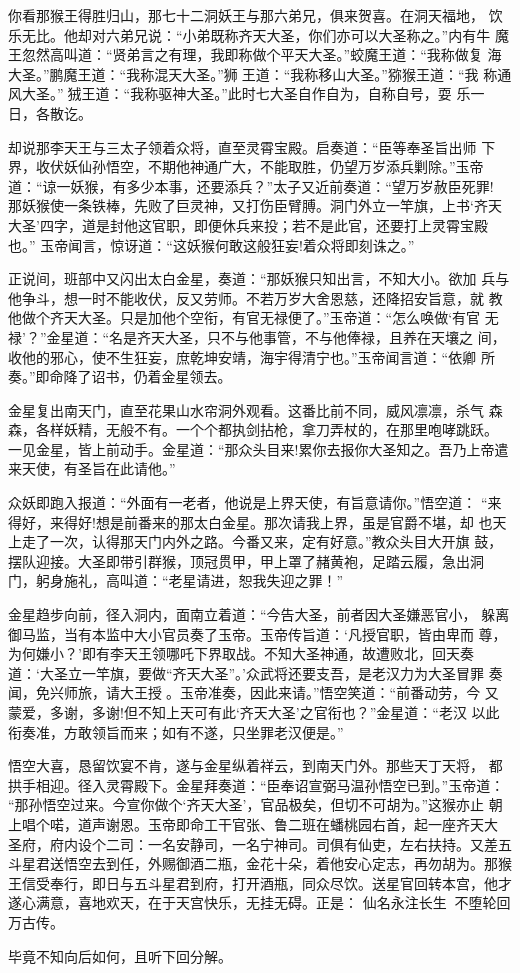 你看那猴王得胜归山，那七十二洞妖王与那六弟兄，俱来贺喜。在洞天福地，
饮乐无比。他却对六弟兄说：“小弟既称齐天大圣，你们亦可以大圣称之。”内有牛
魔王忽然高叫道：“贤弟言之有理，我即称做个平天大圣。”蛟魔王道：“我称做复
海大圣。”鹏魔王道：“我称混天大圣。”狮王道：“我称移山大圣。”猕猴王道：“我
称通风大圣。”狨王道：“我称驱神大圣。”此时七大圣自作自为，自称自号，耍
乐一日，各散讫。

却说那李天王与三太子领着众将，直至灵霄宝殿。启奏道：“臣等奉圣旨出师
下界，收伏妖仙孙悟空，不期他神通广大，不能取胜，仍望万岁添兵剿除。”玉帝
道：“谅一妖猴，有多少本事，还要添兵？”太子又近前奏道：“望万岁赦臣死罪!
那妖猴使一条铁棒，先败了巨灵神，又打伤臣臂膊。洞门外立一竿旗，上书‘齐天
大圣’四字，道是封他这官职，即便休兵来投；若不是此官，还要打上灵霄宝殿也。”
玉帝闻言，惊讶道：“这妖猴何敢这般狂妄!着众将即刻诛之。”

正说间，班部中又闪出太白金星，奏道：“那妖猴只知出言，不知大小。欲加
兵与他争斗，想一时不能收伏，反又劳师。不若万岁大舍恩慈，还降招安旨意，就
教他做个齐天大圣。只是加他个空衔，有官无禄便了。”玉帝道：“怎么唤做‘有官
无禄’？”金星道：“名是齐天大圣，只不与他事管，不与他俸禄，且养在天壤之
间，收他的邪心，使不生狂妄，庶乾坤安靖，海宇得清宁也。”玉帝闻言道：“依卿
所奏。”即命降了诏书，仍着金星领去。

金星复出南天门，直至花果山水帘洞外观看。这番比前不同，威风凛凛，杀气
森森，各样妖精，无般不有。一个个都执剑拈枪，拿刀弄杖的，在那里咆哮跳跃。
一见金星，皆上前动手。金星道：“那众头目来!累你去报你大圣知之。吾乃上帝遣
来天使，有圣旨在此请他。”

众妖即跑入报道：“外面有一老者，他说是上界天使，有旨意请你。”悟空道：
“来得好，来得好!想是前番来的那太白金星。那次请我上界，虽是官爵不堪，却
也天上走了一次，认得那天门内外之路。今番又来，定有好意。”教众头目大开旗
鼓，摆队迎接。大圣即带引群猴，顶冠贯甲，甲上罩了赭黄袍，足踏云履，急出洞
门，躬身施礼，高叫道：“老星请进，恕我失迎之罪！”

金星趋步向前，径入洞内，面南立着道：“今告大圣，前者因大圣嫌恶官小，
躲离御马监，当有本监中大小官员奏了玉帝。玉帝传旨道：‘凡授官职，皆由卑而
尊，为何嫌小？’即有李天王领哪吒下界取战。不知大圣神通，故遭败北，回天奏
道：‘大圣立一竿旗，要做“齐天大圣”。’众武将还要支吾，是老汉力为大圣冒罪
奏闻，免兴师旅，请大王授。玉帝准奏，因此来请。”悟空笑道：“前番动劳，今
又蒙爱，多谢，多谢!但不知上天可有此‘齐天大圣’之官衔也？”金星道：“老汉
以此衔奏准，方敢领旨而来；如有不遂，只坐罪老汉便是。”

悟空大喜，恳留饮宴不肯，遂与金星纵着祥云，到南天门外。那些天丁天将，
都拱手相迎。径入灵霄殿下。金星拜奏道：“臣奉诏宣弼马温孙悟空已到。”玉帝道：
“那孙悟空过来。今宣你做个‘齐天大圣’，官品极矣，但切不可胡为。”这猴亦止
朝上唱个喏，道声谢恩。玉帝即命工干官张、鲁二班在蟠桃园右首，起一座齐天大
圣府，府内设个二司：一名安静司，一名宁神司。司俱有仙吏，左右扶持。又差五
斗星君送悟空去到任，外赐御酒二瓶，金花十朵，着他安心定志，再勿胡为。那猴
王信受奉行，即日与五斗星君到府，打开酒瓶，同众尽饮。送星官回转本宫，他才
遂心满意，喜地欢天，在于天宫快乐，无挂无碍。正是：
仙名永注长生，不堕轮回万古传。

毕竟不知向后如何，且听下回分解。